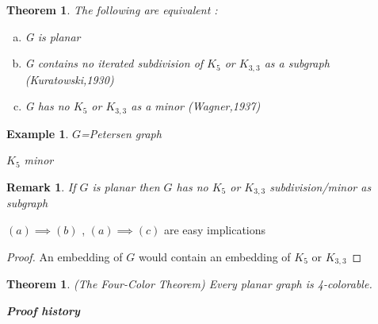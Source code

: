 \documentclass[a4paper]{article}
\theoremstyle{plain}
\newtheorem{theorem}[lemma]{Theorem}
\theoremstyle{myremark}
\newtheorem{remark}[lemma]{Remark}
\newtheorem{example}[lemma]{Example}
\begin{document}
\begin {theorem}The following are equivalent :
\begin{minipage}[t]{\linewidth}
\begin{enumerate}[(a)]
\item {G} is planar
\item {G} contains no iterated subdivision of {$K_5$} or {$K_{3,3}$} as a subgraph 
\newline (Kuratowski,1930)
\item {G} has no {$K_5$} or {$K_{3,3}$} as a minor
\newline (Wagner,1937)
\end {enumerate}
\end {minipage}
\end {theorem}
\bigskip
\begin {example}
{$G$}=Petersen graph
{$K_5$} minor
\end {example}
\begin {remark} If {$G$} is planar then {$G$} has no {$K_5$} or {$K_{3,3}$} subdivision/minor as subgraph
\end {remark}
$(a) \implies (b)$ , $(a) \implies (c)$ are easy implications
\begin {proof} An embedding of {$G$} would contain an embedding of {$K_5$} or {$K_{3,3}$}
\end {proof}
\bigskip
\begin {theorem} (The Four-Color Theorem)
Every planar graph is 4-colorable.
\end {theorem}
\bigskip
\textbf{\textit{Proof history}}
\end{document}
